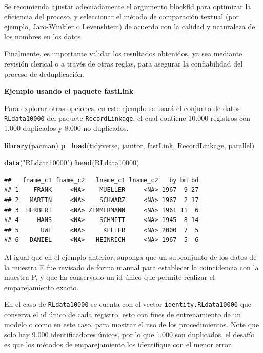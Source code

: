 \documentclass[
  12pt,
]{book}
\newenvironment{Shaded}{\begin{snugshade}}{\end{snugshade}}
\newcommand{\FunctionTok}[1]{\textcolor[rgb]{0.13,0.29,0.53}{\textbf{#1}}}
\newcommand{\NormalTok}[1]{#1}
\newcommand{\StringTok}[1]{\textcolor[rgb]{0.31,0.60,0.02}{#1}}
\begin{document}
Se recomienda ajustar adecuadamente el argumento blockfld para optimizar la eficiencia del proceso, y seleccionar el método de comparación textual (por ejemplo, Jaro-Winkler o Levenshtein) de acuerdo con la calidad y naturaleza de los nombres en los datos.

Finalmente, es importante validar los resultados obtenidos, ya sea mediante revisión clerical o a través de otras reglas, para asegurar la confiabilidad del proceso de deduplicación.

\textbf{Ejemplo usando el paquete fastLink}

Para explorar otras opciones, en este ejemplo se usará el conjunto de datos \texttt{RLdata10000} del paquete \texttt{RecordLinkage}, el cual contiene 10.000 registros con 1.000 duplicados y 8.000 no duplicados.

\begin{Shaded}
\begin{Highlighting}[]
\FunctionTok{library}\NormalTok{(pacman)}
\FunctionTok{p\_load}\NormalTok{(tidyverse, janitor, fastLink, RecordLinkage, parallel)}

\FunctionTok{data}\NormalTok{(}\StringTok{"RLdata10000"}\NormalTok{)}
\FunctionTok{head}\NormalTok{(RLdata10000)}
\end{Highlighting}
\end{Shaded}

\begin{verbatim}
##   fname_c1 fname_c2   lname_c1 lname_c2   by bm bd
## 1    FRANK     <NA>    MUELLER     <NA> 1967  9 27
## 2   MARTIN     <NA>    SCHWARZ     <NA> 1967  2 17
## 3  HERBERT     <NA> ZIMMERMANN     <NA> 1961 11  6
## 4     HANS     <NA>    SCHMITT     <NA> 1945  8 14
## 5      UWE     <NA>     KELLER     <NA> 2000  7  5
## 6   DANIEL     <NA>   HEINRICH     <NA> 1967  5  6
\end{verbatim}

Al igual que en el ejemplo anterior, suponga que un subconjunto de los datos de la muestra E fue revisado de forma manual para establecer la coincidencia con la muestra P, y que ha conservado un id único que permite realizar el emparejamiento exacto.

En el caso de \texttt{RLdata10000} se cuenta con el vector \texttt{identity.RLdata10000} que conserva el id único de cada registro, esto con fines de entrenamiento de un modelo o como en este caso, para mostrar el uso de los procedimientos. Note que solo hay 9.000 identificadores únicos, por lo que 1.000 son duplicados, el desafío es que los métodos de emparejamiento los identifique con el menor error.
\end{document}
